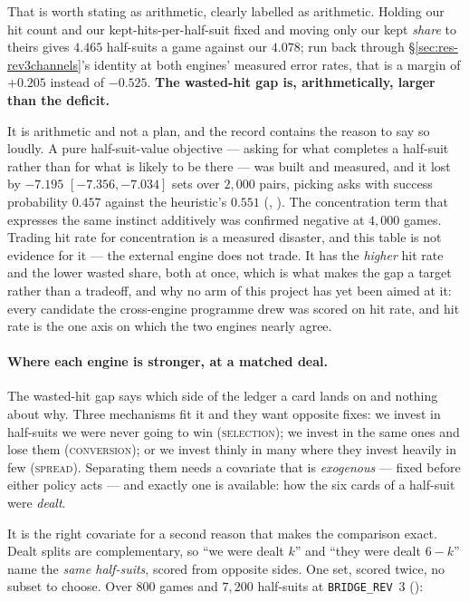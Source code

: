 \documentclass[11pt,letterpaper]{article}
\begin{document}
\noindent That is worth stating as arithmetic, clearly labelled as
arithmetic. Holding our hit count and our kept-hits-per-half-suit fixed and
moving only our kept \emph{share} to theirs gives $4.465$ half-suits a game
against our $4.078$; run back through \S\ref{sec:res-rev3channels}'s identity
at both engines' measured error rates, that is a margin of $+0.205$ instead
of $-0.525$. \textbf{The wasted-hit gap is, arithmetically, larger than the
deficit.}

It is arithmetic and not a plan, and the record contains the reason to say so
loudly. A pure half-suit-value objective --- asking for what completes a
half-suit rather than for what is likely to be there --- was built and
measured, and it lost by $\mathbf{-7.195}$ $[-7.356, -7.034]$ sets over
$2{,}000$ pairs, picking asks with success probability $0.457$ against the
heuristic's $0.551$
(,
). The concentration term that
expresses the same instinct additively was confirmed negative at $4{,}000$
games. Trading hit rate for concentration is a measured disaster, and this
table is not evidence for it --- the external engine does not trade. It has
the \emph{higher} hit rate and the lower wasted share, both at once, which is
what makes the gap a target rather than a tradeoff, and why no arm of this
project has yet been aimed at it: every candidate the cross-engine programme
drew was scored on hit rate, and hit rate is the one axis on which the two
engines nearly agree.

\paragraph{Where each engine is stronger, at a matched deal.}
\label{sec:res-conversion}
The wasted-hit gap says which side of the ledger a card lands on and nothing
about why. Three mechanisms fit it and they want opposite fixes: we invest in
half-suits we were never going to win (\textsc{selection}); we invest in the
same ones and lose them (\textsc{conversion}); or we invest thinly in many
where they invest heavily in few (\textsc{spread}). Separating them needs a
covariate that is \emph{exogenous} --- fixed before either policy acts --- and
exactly one is available: how the six cards of a half-suit were \emph{dealt}.

It is the right covariate for a second reason that makes the comparison exact.
Dealt splits are complementary, so ``we were dealt $k$'' and ``they were dealt
$6-k$'' name the \emph{same half-suits}, scored from opposite sides. One set,
scored twice, no subset to choose. Over $800$ games and $7{,}200$ half-suits
at \texttt{BRIDGE\_REV}~3 ():
\end{document}
